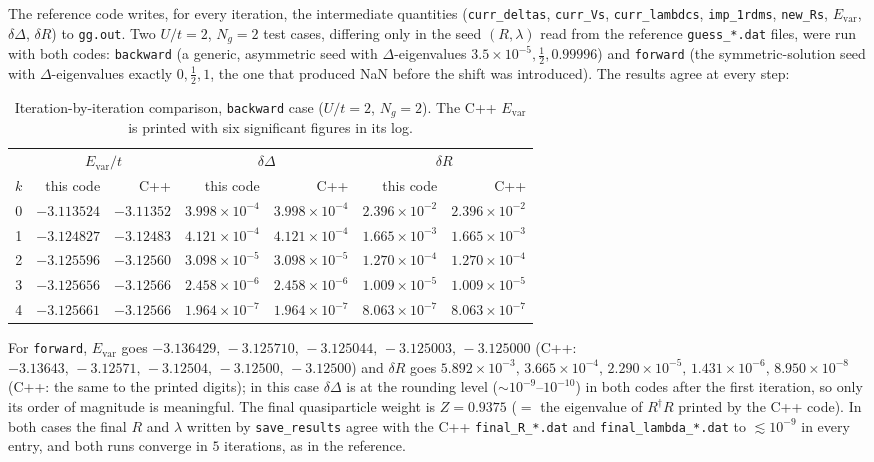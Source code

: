 \documentclass[11pt]{article}
\newcommand{\Ng}{N_{g}}
\begin{document}
The reference code writes, for every iteration, the intermediate quantities
(\texttt{curr\_deltas}, \texttt{curr\_Vs}, \texttt{curr\_lambdcs},
\texttt{imp\_1rdms}, \texttt{new\_Rs}, $E_{\mathrm{var}}$, $\delta\Delta$,
$\delta R$) to \texttt{gg.out}. Two $U/t=2$, $\Ng=2$ test cases, differing only
in the seed $(R,\lambda)$ read from the reference \texttt{guess\_*.dat}
files, were run with both codes: \texttt{backward} (a generic, asymmetric seed
with $\Delta$-eigenvalues $3.5\times10^{-5},\tfrac12,0.99996$) and
\texttt{forward} (the symmetric-solution seed with $\Delta$-eigenvalues
exactly $0,\tfrac12,1$, the one that produced NaN before the shift was
introduced). The results agree at every step:
\begin{table}[h]
\centering
\small
\begin{tabular}{crrrrrr}
\toprule
 & \multicolumn{2}{c}{$E_{\mathrm{var}}/t$} & \multicolumn{2}{c}{$\delta\Delta$} & \multicolumn{2}{c}{$\delta R$} \\
\cmidrule(lr){2-3}\cmidrule(lr){4-5}\cmidrule(lr){6-7}
$k$ & this code & C++ & this code & C++ & this code & C++ \\
\midrule
0 & $-3.113524$ & $-3.11352$ & $3.998\!\times\!10^{-4}$ & $3.998\!\times\!10^{-4}$ & $2.396\!\times\!10^{-2}$ & $2.396\!\times\!10^{-2}$ \\
1 & $-3.124827$ & $-3.12483$ & $4.121\!\times\!10^{-4}$ & $4.121\!\times\!10^{-4}$ & $1.665\!\times\!10^{-3}$ & $1.665\!\times\!10^{-3}$ \\
2 & $-3.125596$ & $-3.12560$ & $3.098\!\times\!10^{-5}$ & $3.098\!\times\!10^{-5}$ & $1.270\!\times\!10^{-4}$ & $1.270\!\times\!10^{-4}$ \\
3 & $-3.125656$ & $-3.12566$ & $2.458\!\times\!10^{-6}$ & $2.458\!\times\!10^{-6}$ & $1.009\!\times\!10^{-5}$ & $1.009\!\times\!10^{-5}$ \\
4 & $-3.125661$ & $-3.12566$ & $1.964\!\times\!10^{-7}$ & $1.964\!\times\!10^{-7}$ & $8.063\!\times\!10^{-7}$ & $8.063\!\times\!10^{-7}$ \\
\bottomrule
\end{tabular}
\caption{Iteration-by-iteration comparison, \texttt{backward} case
($U/t=2$, $\Ng=2$). The C++ $E_{\mathrm{var}}$ is printed with six
significant figures in its log.}
\label{tab:cppcompare}
\end{table}

For \texttt{forward}, $E_{\mathrm{var}}$ goes $-3.136429,\,-3.125710,\,
-3.125044,\,-3.125003,\,-3.125000$ (C++: $-3.13643,\,-3.12571,\,-3.12504,\,
-3.12500,\,-3.12500$) and $\delta R$ goes $5.892\!\times\!10^{-3},\,
3.665\!\times\!10^{-4},\,2.290\!\times\!10^{-5},\,1.431\!\times\!10^{-6},\,
8.950\!\times\!10^{-8}$ (C++: the same to the printed digits); in this case
$\delta\Delta$ is at the rounding level ($\sim10^{-9}$--$10^{-10}$) in both
codes after the first iteration, so only its order of magnitude is
meaningful. The final quasiparticle weight is $Z=0.9375$ ($=$ the
eigenvalue of $R^\dagger R$ printed by the C++ code). In both cases the
final $R$ and $\lambda$ written by \texttt{save\_results} agree with the C++
\texttt{final\_R\_*.dat} and \texttt{final\_lambda\_*.dat} to
$\lesssim10^{-9}$ in every entry, and both runs converge in $5$
iterations, as in the reference.
\end{document}

